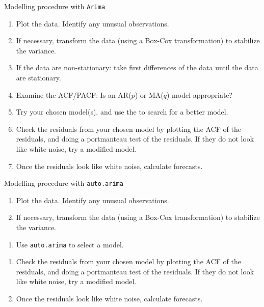 \documentclass[14pt,ignorenonframetext,]{beamer}
\providecommand{\tightlist}{%
  \setlength{\itemsep}{0pt}\setlength{\parskip}{0pt}}
\begin{document}
\begin{frame}{Modelling procedure with \texttt{Arima}}

\fontsize{12}{13}\sf

\begin{enumerate}
\def\labelenumi{\arabic{enumi}.}
\tightlist
\item
  Plot the data. Identify any unusual observations.
\item
  If necessary, transform the data (using a Box-Cox transformation) to
  stabilize the variance.
\item
  If the data are non-stationary: take first differences of the data
  until the data are stationary.
\item
  Examine the ACF/PACF: Is an AR(\(p\)) or MA(\(q\)) model appropriate?
\item
  Try your chosen model(s), and use the  to search for a
  better model.
\item
  Check the residuals from your chosen model by plotting the ACF of the
  residuals, and doing a portmanteau test of the residuals. If they do
  not look like white noise, try a modified model.
\item
  Once the residuals look like white noise, calculate forecasts.
\end{enumerate}

\end{frame}

\begin{frame}[fragile]{Modelling procedure with \texttt{auto.arima}}

\fontsize{12}{13}\sf

\begin{enumerate}
\def\labelenumi{\arabic{enumi}.}
\tightlist
\item
  Plot the data. Identify any unusual observations.
\item
  If necessary, transform the data (using a Box-Cox transformation) to
  stabilize the variance.
\end{enumerate}

\vspace*{1.15cm}

\begin{enumerate}
\def\labelenumi{\arabic{enumi}.}
\setcounter{enumi}{2}
\tightlist
\item
  Use \texttt{auto.arima} to select a model.
\end{enumerate}

\vspace*{1.15cm}

\begin{enumerate}
\def\labelenumi{\arabic{enumi}.}
\setcounter{enumi}{5}
\tightlist
\item
  Check the residuals from your chosen model by plotting the ACF of the
  residuals, and doing a portmanteau test of the residuals. If they do
  not look like white noise, try a modified model.
\item
  Once the residuals look like white noise, calculate forecasts.
\end{enumerate}

\end{frame}
\end{document}
